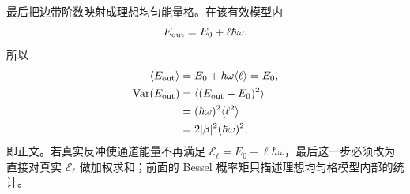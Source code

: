 \begin{derivation}
最后把边带阶数映射成理想均匀能量格。在该有效模型内
\begin{equation*}
 E_{\rm out}=E_0+\ell\hbar\omega.
\end{equation*}
所以
\begin{align*}
 \langle E_{\rm out}\rangle
 &=E_0+\hbar\omega\langle\ell\rangle
 =E_0,\\
 \operatorname{Var}(E_{\rm out})
 &=\langle(E_{\rm out}-E_0)^2\rangle\\
 &=(\hbar\omega)^2\langle\ell^2\rangle\\
 &=2|\beta|^2(\hbar\omega)^2,
\end{align*}
即正文。若真实反冲使通道能量不再满足 $\mathcal E_\ell=E_0+\ell\hbar\omega$，最后这一步必须改为直接对真实 $\mathcal E_\ell$ 做加权求和；前面的 Bessel 概率矩只描述理想均匀格模型内部的统计。
\end{derivation}
